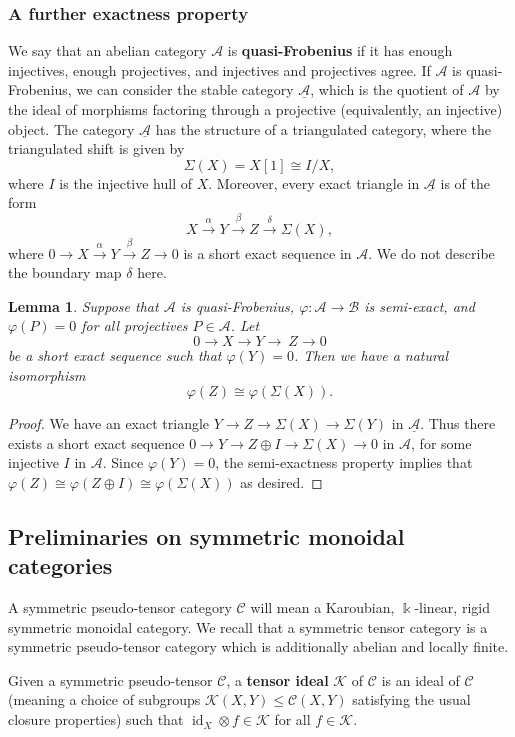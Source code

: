 \documentclass[11pt]{amsart}
\def\KK{\mathcal{K}}
\def\Cs{\mathcal{C}}
\def\As{\mathscr{A}}
\def\Bs{\mathscr{B}}
\def\Cs{\mathscr{C}}
\def\ul{\underline}
\def\xto{\xrightarrow}
\newtheorem{lemma}[thm]{Lemma}
\theoremstyle{definition}
\theoremstyle{remark}
\numberwithin{equation}{section}
\begin{document}
\subsubsection{A further exactness property}
We say that an abelian category $\As$ is \textbf{quasi-Frobenius} if it has enough injectives, enough projectives, and injectives and projectives agree.  If $\As$ is quasi-Frobenius, we can consider the stable category $\ul{\As}$, which is the quotient of $\As$ by the ideal of morphisms factoring through a projective (equivalently, an injective) object.  The category $\ul{\As}$ has the structure of a triangulated category, where the triangulated shift is given by
\[
\Sigma(X)=X[1]\cong I/X,
\]
where $I$ is the injective hull of $X$.  Moreover, every exact triangle in $\ul{\As}$ is of the form
\[
X\xto{\alpha} Y\xto{\beta} Z\xto{\delta} \Sigma( X),
\]
where $0\to X\xto{\alpha} Y\xto{\beta} Z\to 0$ is a short exact sequence in $\As$. We do not describe the boundary map $\delta$ here.  

\begin{lemma}\label{lemma semi exact q frob}
    Suppose that $\As$ is quasi-Frobenius, $\varphi:\As\to\Bs$ is semi-exact, and $\varphi(P)=0$ for all projectives $P\in\As$.  Let
    \[
    0\to X\to Y\to\ Z\to 0
    \]
    be a short exact sequence such that $\varphi(Y)=0$.  Then we have a natural isomorphism
    \[
   \varphi(Z)\cong\varphi(\Sigma(X)).
    \]
\end{lemma}

\begin{proof}
    We have an exact triangle $Y\to Z\to \Sigma(X)\to \Sigma(Y)$ in $\ul{\As}$.  Thus there exists a short exact sequence $0\to Y\to Z\oplus I\to \Sigma(X)\to 0$ in $\As$, for some injective $I$ in $\As$.  Since $\varphi(Y)=0$, the semi-exactness property implies that $\varphi(Z)\cong \varphi(Z\oplus I)\cong \varphi(\Sigma(X))$ as desired.  
\end{proof}

\subsection{Preliminaries on symmetric monoidal categories}  A symmetric pseudo-tensor category $\Cs$ will mean a Karoubian, $\Bbbk$-linear, rigid symmetric monoidal category.  We recall that a symmetric tensor category is a symmetric pseudo-tensor category which is additionally abelian and locally finite.

Given a symmetric pseudo-tensor $\Cs$, a \textbf{tensor ideal} $\KK$ of $\Cs$ is an ideal of $\Cs$ (meaning a choice of subgroups $\KK(X,Y)\leq\Cs(X,Y)$ satisfying the usual closure properties) such that $\operatorname{id}_X\otimes f\in\KK$ for all $f\in\KK$.  
\end{document}
